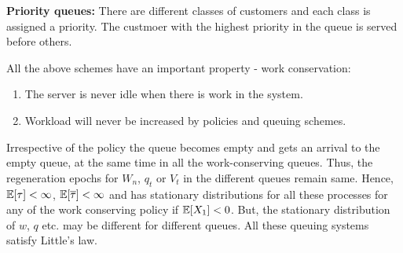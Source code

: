 \documentclass[all-lectures.tex]{subfiles}
\begin{document}
\textbf{Priority queues:} There are different classes of customers and each class is assigned a priority. The custmoer with the highest priority in the queue is served before others. 

All  the above schemes have an important property - work conservation:
\begin{enumerate}
\item The server is never idle when there is work in the system.
\item Workload will never be increased by policies and queuing schemes. 
\end{enumerate}
\indent Irrespective of the policy the queue becomes empty and gets an arrival to the empty queue, at the same time in all the work-conserving queues. Thus, the  regeneration epochs for $W_n$, $q_t$ or $V_t$ in the different queues remain same. Hence, $\mathbb{E}[\tau]< \infty$, $\mathbb{E}[\overline{\tau}] < \infty$ and has stationary distributions for all these processes for any of the work conserving policy if $\mathbb{E}[X_1] < 0$. But, the stationary distribution of $w$, $q$ etc. may be different for different queues. All these queuing systems satisfy Little's law.

\end{document}
